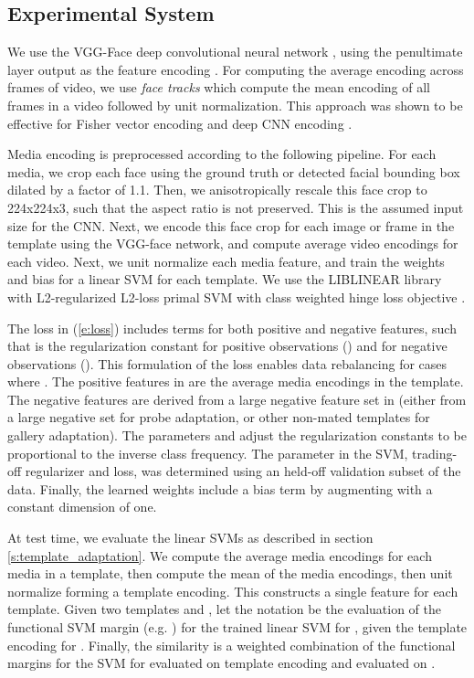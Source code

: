 \documentclass[10pt,twocolumn,letterpaper]{article}
\theoremstyle{definition}		\newtheorem{defn}[thm]{Definition}
\newcommand{\ARXIV}{}
\begin{document}
\subsection{Experimental System}
\label{ss:experimental_system}
We use the VGG-Face deep convolutional neural network \cite{Parkhi15}, using the penultimate layer output as the feature encoding .  
For computing the average encoding across frames of video, we use {\em face tracks} which compute the mean encoding of all frames in a video followed by unit normalization.  This approach was shown to be effective for Fisher vector encoding  \cite{Parkhi14} and 
deep CNN encoding \cite{Parkhi15}. 

Media encoding is preprocessed according to the following pipeline.  
For each media, we crop each face using the ground truth or detected facial bounding box dilated by a factor of 1.1.  Then, we anisotropically rescale this face crop to 224x224x3, such that the aspect ratio is not preserved.  This is the assumed input size for the CNN.  Next, we encode this face crop for each image or frame in the template using the VGG-face network, and compute average video encodings for each video.  Next, we unit normalize each media feature, and train the weights and bias for a linear SVM for each template.  We use the LIBLINEAR library with L2-regularized L2-loss primal SVM with class weighted hinge loss objective  \cite{Fan08}.  
\ifdefined\ARXIV  
\else  
\fi

The loss in (\ref{e:loss}) includes terms for both positive and negative features, such that  is the regularization constant for  positive observations () and  for negative observations ().  This formulation of the loss enables data rebalancing for cases where .  The positive features in  are the average media encodings in the template.  The negative features are derived from a large negative feature set in  (either from a large negative set for probe adaptation, or other non-mated templates for gallery adaptation).  The parameters  and  adjust the regularization constants to be proportional to the inverse class frequency.  The parameter  in the SVM, trading-off regularizer and loss, was determined using an held-off validation subset of the data.  Finally, the learned weights  include a bias term by augmenting  with a constant dimension of one. 

At test time, we evaluate the linear SVMs as described in section \ref{s:template_adaptation}.  We compute the average media encodings for each media in a template, then compute the mean of the media encodings, then unit normalize forming a template encoding. This constructs a single feature for each template.  Given two templates  and , let the notation  be the evaluation of the functional SVM margin (e.g. ) for the trained linear SVM for , given the template encoding  for .  Finally, the similarity  is a weighted combination of the functional margins for the SVM for  evaluated on template encoding  and  evaluated on .
\end{document}
